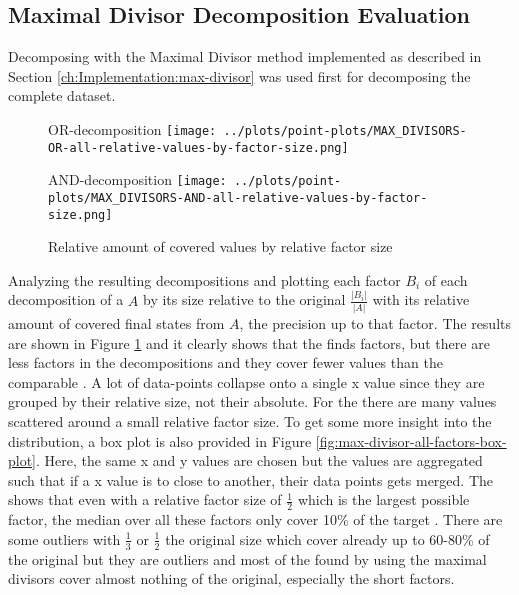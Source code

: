 \subsection{Maximal Divisor Decomposition Evaluation}
Decomposing with the Maximal Divisor method implemented as described in Section \ref{ch:Implementation:max-divisor} was used first for decomposing the complete dataset.
\begin{figure}[h]
	\begin{minipage}[h]{0.49\linewidth}
		\centering
		OR-decomposition
	\texttt{[image: ../plots/point-plots/MAX\_DIVISORS-OR-all-relative-values-by-factor-size.png]}
	\end{minipage}
	\begin{minipage}[h]{0.49\linewidth}
		\centering
		AND-decomposition
	\texttt{[image: ../plots/point-plots/MAX\_DIVISORS-AND-all-relative-values-by-factor-size.png]}
\end{minipage}
\caption{Relative amount of covered values by relative factor size}
\label{fig:max-divisor-all-factors}
\end{figure}
Analyzing the resulting decompositions and plotting each factor $B_i$ of each decomposition of a \DFA $A$ by its size relative to the original $\frac{|B_i|}{|A|}$ with its relative amount of covered final states from $A$, the precision up to that factor. The results are shown in Figure \ref{fig:max-divisor-all-factors} and it clearly shows that the \orDecomp finds factors, but there are less factors in the decompositions and they cover fewer values than the comparable \andDecomp. A lot of data-points collapse onto a single x value since they are grouped by their relative size, not their absolute. For the \andDecomp there are many values scattered around a small relative factor size. To get some more insight into the distribution, a box plot is also provided in Figure \ref{fig:max-divisor-all-factors-box-plot}. Here, the same x and y values are chosen but the values are aggregated such that if a x value is to close to another, their data points gets merged. The \orDecomp shows that even with a relative factor size of $\frac{1}{2}$ which is the largest possible factor, the median over all these factors only cover 10\% of the target \DFA. There are some outliers with $\frac{1}{3}$ or $\frac{1}{2}$ the original size which cover already up to 60-80\% of the original \DFA but they are outliers and most of the \orDecomp found by using the maximal divisors cover almost nothing of the original, especially the short factors.
